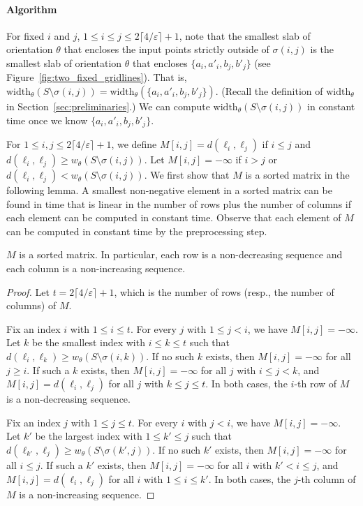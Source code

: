 \documentclass[english,a4paper, cleveref, autoref, thm-restate, nolineno]{socg-lipics-v2021}
\theoremstyle{star}
\theoremstyle{claimstar}
\newcommand{\eps}{\ensuremath{\varepsilon}}
\newcommand{\width}{\ensuremath{\mathrm{width}}}
\begin{document}
\paragraph*{Algorithm} 
For fixed $i$ and $j$, $ 1 \le i \le j \le 2\lceil 4/\eps \rceil +1  $, note that the smallest slab of orientation $\theta$ that encloses the input points strictly outside of $\sigma(i, j)$ is the smallest slab of orientation $\theta$ that encloses $\{a_i, a'_i, b_j, b'_j \}$ (see Figure~\ref{fig:two_fixed_gridlines}). 
That is, $\width_\theta(S \setminus \sigma(i, j)) = \width_\theta (\{a_i, a'_i, b_j, b'_j \})$.
(Recall the definition of $\width_\theta$ in Section~\ref{sec:preliminaries}.)
We can compute $\width_\theta(S \setminus \sigma(i, j))$ in constant time once we know $\{a_i, a'_i, b_j, b'_j \}$. 

For  $  1 \le i, j \le 2\lceil 4/\eps \rceil +1$, 
we define $M[i, j] = d(\ell_i, \ell_j)$ if $i\le j$ and 
$d(\ell_i, \ell_j) \ge w_\theta(S \setminus \sigma(i, j))$. 
Let $M[i, j] = -\infty$ if $i>j$ or $d(\ell_i, \ell_j) < w_\theta(S \setminus \sigma(i, j))$. 
We first show that $M$ is a sorted matrix in the following lemma. 
A smallest non-negative element in a sorted matrix can be found in time that is linear in the number of rows plus the number of columns if each element can be computed in constant time.
Observe that each element of $M$ can be computed in constant time by the preprocessing step. 


\begin{lemma}
    $M$ is a sorted matrix. In particular, each row is a non-decreasing sequence and each column is a non-increasing sequence. 
\end{lemma}
\begin{proof}

    Let $t = 2\lceil 4/\eps \rceil + 1$, which is the number of rows (resp., the number of columns) of $M$.

    Fix an index $i$ with $1 \le i \le t$.  
    For every $j$ with $1 \le j < i$, we have $M[i,j] = -\infty$.
    Let $k$ be the smallest index with $i \le k \le t$ such that $d(\ell_i, \ell_k) \ge w_\theta(S \setminus \sigma(i,k))$.  
    If no such $k$ exists, then $M[i,j] = -\infty$ for all $j \ge i$.  
    If such a $k$ exists, then $M[i,j] = -\infty$ for all $j$ with $i \le j < k$, and $M[i,j] = d(\ell_i, \ell_j)$ for all $j$ with $k \le j \le t$.  
    In both cases, the $i$-th row of $M$ is a non-decreasing sequence.
    
    Fix an index $j$ with $1 \le j \le t$.  
    For every $i$ with $j < i$, we have $M[i,j] = -\infty$.
    Let $k'$ be the largest index with $1 \le k' \le j$ such that $d(\ell_{k'}, \ell_j) \ge w_\theta(S \setminus \sigma(k',j))$.  
    If no such $k'$ exists, then $M[i,j] = -\infty$ for all $i \le j$.  
    If such a $k'$ exists, then $M[i,j] = -\infty$ for all $i$ with $k' < i \le j$, and $M[i,j] = d(\ell_i, \ell_j)$ for all $i$ with $1 \le i \le k'$.  
    In both cases, the $j$-th column of $M$ is a non-increasing sequence.
\end{proof}
\end{document}
